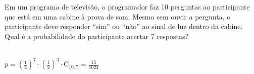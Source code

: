 \begin{ex}
Em um programa de televisão, o programador faz 10 perguntas ao participante que está em uma cabine à prova de som. Mesmo sem ouvir a pergunta, o participante deve responder “sim” ou “não” ao sinal de luz dentro da cabine. Qual é a probabilidade do participante acertar 7 respostas?
  \begin{sol}
    \phantom{A} \\
    $p=(\frac{1}{2})^7\cdot(\frac{1}{2})^3\cdot\mathrm{C}_{{10},7}=\frac{15}{1024}$
  \end{sol}
\end{ex}